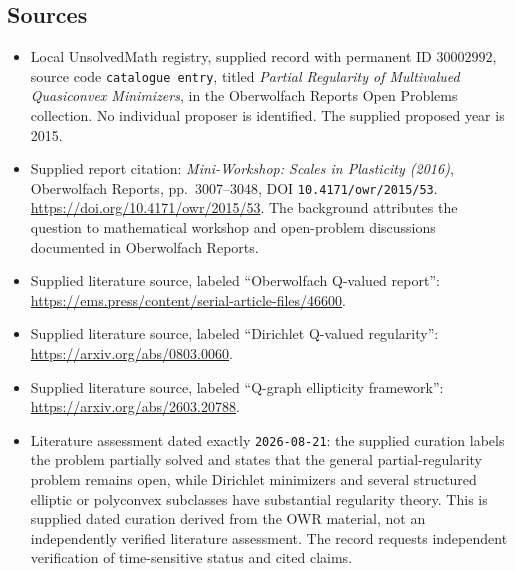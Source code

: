 \documentclass[11pt]{article}
\begin{document}
\subsection{Sources}
\begin{itemize}
\item Local UnsolvedMath registry, supplied record with permanent ID \(30002992\), source code \texttt{catalogue entry}, titled \emph{Partial Regularity of Multivalued Quasiconvex Minimizers}, in the Oberwolfach Reports Open Problems collection. No individual proposer is identified. The supplied proposed year is 2015.
\item Supplied report citation: \emph{Mini-Workshop: Scales in Plasticity (2016)}, Oberwolfach Reports, pp.\ 3007--3048, DOI \texttt{10.4171/owr/2015/53}. \url{https://doi.org/10.4171/owr/2015/53}. The background attributes the question to mathematical workshop and open-problem discussions documented in Oberwolfach Reports.
\item Supplied literature source, labeled ``Oberwolfach Q-valued report'': \url{https://ems.press/content/serial-article-files/46600}.
\item Supplied literature source, labeled ``Dirichlet Q-valued regularity'': \url{https://arxiv.org/abs/0803.0060}.
\item Supplied literature source, labeled ``Q-graph ellipticity framework'': \url{https://arxiv.org/abs/2603.20788}.
\item Literature assessment dated exactly \texttt{2026-08-21}: the supplied curation labels the problem partially solved and states that the general partial-regularity problem remains open, while Dirichlet minimizers and several structured elliptic or polyconvex subclasses have substantial regularity theory. This is supplied dated curation derived from the OWR material, not an independently verified literature assessment. The record requests independent verification of time-sensitive status and cited claims.
\end{itemize}
\end{document}
